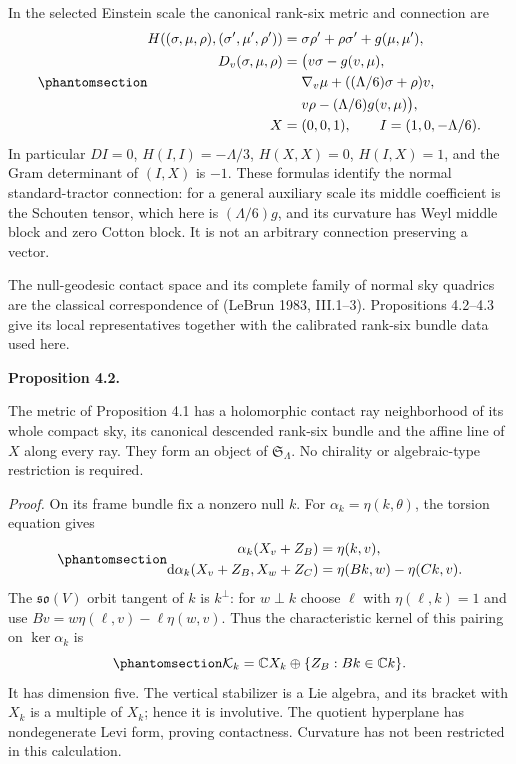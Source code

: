 \documentclass[
  english,
  11pt,
  reqno]{amsart}
\makeatletter
\newcommand{\pandocstatementheading}[1]{%
  \par\addpenalty{\@beginparpenalty}%
  \addvspace{.5\baselineskip plus .2\baselineskip minus .2\baselineskip}%
  {\normalfont\bfseries #1\par}%
  \nobreak\@afterindenttrue\@afterheading
}
\makeatother
\begin{document}
In the selected Einstein scale the canonical rank-six metric and
connection are
\begin{equation}\protect\phantomsection\label{eq:gg-canonical-tractor}{\begin{aligned}
H((\sigma,\mu,\rho),(\sigma',\mu',\rho'))
   &=\sigma\rho'+\rho\sigma'+g(\mu,\mu'), \\
D_v(\sigma,\mu,\rho)
   &=\bigl(v\sigma-g(v,\mu),\\
 &\quad \
      \nabla_v\mu+((\Lambda/6)\sigma+\rho)v,\\
 &\quad \
      v\rho-(\Lambda/6)g(v,\mu)\bigr), \\
X&=(0,0,1),\qquad I=(1,0,-\Lambda/6).
\end{aligned}}\end{equation} In particular \(DI=0\), \(H(I,I)=-\Lambda/3\),
\(H(X,X)=0\), \(H(I,X)=1\), and the Gram determinant of \((I,X)\) is
\(-1\). These formulas identify the normal standard-tractor connection:
for a general auxiliary scale its middle coefficient is the Schouten
tensor, which here is \((\Lambda/6)g\), and its curvature has Weyl
middle block and zero Cotton block. It is not an arbitrary connection
preserving a vector.

The null-geodesic contact space and its complete family of normal sky
quadrics are the classical correspondence of (LeBrun 1983, III.1--3).
Propositions 4.2--4.3 give its local representatives together with the
calibrated rank-six bundle data used here.

\pandocstatementheading{\protect\phantomsection\label{prop:gg-ray-construction}Proposition 4.2.}

The metric of Proposition 4.1 has a holomorphic contact ray neighborhood
of its whole compact sky, its canonical descended rank-six bundle and
the affine line of \(X\) along every ray. They form an object of
\(\mathfrak S_\Lambda\). No chirality or algebraic-type restriction is
required.

\emph{Proof.} On its frame bundle fix a nonzero null \(k\). For
\(\alpha_k=\eta(k,\theta)\), the torsion equation gives
\begin{equation}\protect\phantomsection\label{eq:gg-ray-levi-pairing}{
 \begin{aligned}
 \alpha_k(X_v+Z_B)&=\eta(k,v),\\
 \mathrm d\alpha_k(X_v+Z_B,X_w+Z_C)
       &=\eta(Bk,w)-\eta(Ck,v).
 \end{aligned}
}\end{equation} The \(\mathfrak{so}(V)\) orbit tangent of \(k\) is
\(k^\perp\): for \(w\perp k\) choose \(\ell\) with \(\eta(\ell,k)=1\)
and use \(Bv=w\eta(\ell,v)-\ell\eta(w,v)\). Thus the characteristic
kernel of this pairing on \(\ker\alpha_k\) is
\begin{equation}\protect\phantomsection\label{eq:gg-ray-characteristic}{
 \mathcal K_k=\mathbb CX_k
       \oplus\{Z_B:Bk\in\mathbb Ck\}.
}\end{equation} It has dimension five. The vertical stabilizer is a Lie
algebra, and its bracket with \(X_k\) is a multiple of \(X_k\); hence it
is involutive. The quotient hyperplane has nondegenerate Levi form,
proving contactness. Curvature has not been restricted in this
calculation.
\end{document}
